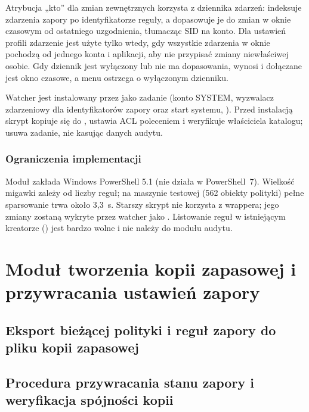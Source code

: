 Atrybucja „kto” dla zmian zewnętrznych korzysta z dziennika zdarzeń:  indeksuje zdarzenia zapory po identyfikatorze reguły, a  dopasowuje je do zmian w oknie czasowym od ostatniego uzgodnienia, tłumacząc SID na konto. Dla ustawień profili zdarzenie jest użyte tylko wtedy, gdy wszystkie zdarzenia w oknie pochodzą od jednego konta i aplikacji, aby nie przypisać zmiany niewłaściwej osobie. Gdy dziennik jest wyłączony lub nie ma dopasowania,  wynosi  i dołączane jest okno czasowe, a menu ostrzega o wyłączonym dzienniku.

Watcher jest instalowany przez  jako zadanie \file{\FirewallAudit\Watcher} (konto SYSTEM, wyzwalacz zdarzeniowy dla identyfikatorów zapory oraz start systemu, ). Przed instalacją skrypt kopiuje się do , ustawia ACL poleceniem  i weryfikuje właściciela katalogu;  usuwa zadanie, nie kasując danych audytu.

\subsubsection*{Ograniczenia implementacji}

Moduł zakłada Windows PowerShell 5.1 (nie działa w PowerShell~7). Wielkość migawki zależy od liczby reguł; na maszynie testowej (562 obiekty polityki) pełne sparsowanie trwa około 3,3~s. Starszy skrypt  nie korzysta z wrappera; jego zmiany zostaną wykryte przez watcher jako . Listowanie reguł w istniejącym kreatorze () jest bardzo wolne i nie należy do modułu audytu.

\section{Moduł tworzenia kopii zapasowej i przywracania ustawień zapory}\label{sec:modul-backup}

\subsection{Eksport bieżącej polityki i reguł zapory do pliku kopii zapasowej}\label{subsec:eksport-konfiguracji}

\subsection{Procedura przywracania stanu zapory i weryfikacja spójności kopii}\label{subsec:import-konfiguracji}
